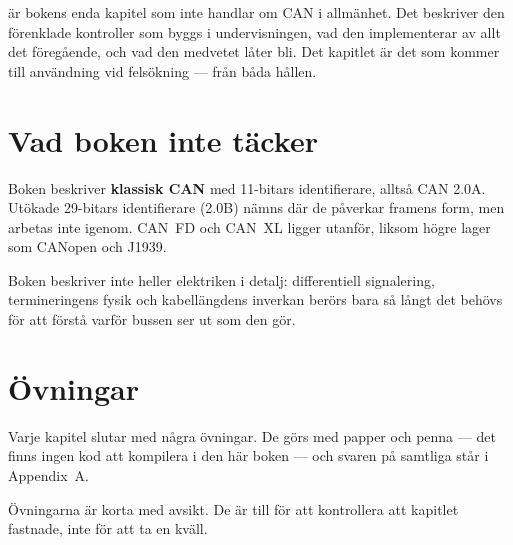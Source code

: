  är bokens enda kapitel som inte handlar om CAN i allmänhet. Det beskriver den
förenklade kontroller som byggs i undervisningen, vad den implementerar av allt det föregående,
och vad den medvetet låter bli. Det kapitlet är det som kommer till användning vid felsökning ---
från båda hållen.

\section*{Vad boken inte täcker}

Boken beskriver \textbf{klassisk CAN} med 11-bitars identifierare, alltså CAN 2.0A. Utökade
29-bitars identifierare (2.0B) nämns där de påverkar framens form, men arbetas inte igenom. CAN~FD
och CAN~XL ligger utanför, liksom högre lager som CANopen och J1939.

Boken beskriver inte heller elektriken i detalj: differentiell signalering, termineringens
fysik och kabellängdens inverkan berörs bara så långt det behövs för att förstå varför bussen
ser ut som den gör.

\section*{Övningar}

Varje kapitel slutar med några övningar. De görs med papper och penna --- det finns ingen kod att
kompilera i den här boken --- och svaren på samtliga står i Appendix~A.

Övningarna är korta med avsikt. De är till för att kontrollera att kapitlet fastnade, inte för
att ta en kväll.
